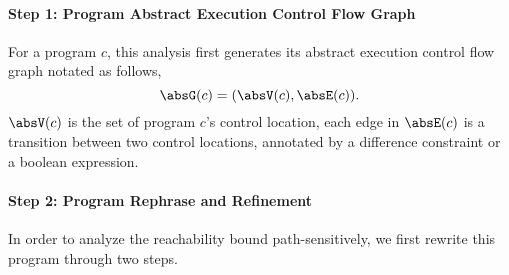\paragraph{Step 1: Program Abstract Execution Control Flow Graph}
For a program $c$, this analysis first generates its abstract execution control flow graph notated as follows,
\[\absG(c) =(\absV(c), \absE(c)).\]
%
$\absV(c)$ is the set of program $c$'s control location, each edge in $\absE(c)$ is a transition
between two control locations, annotated by a difference constraint \cite{sinn2017complexity} or a boolean expression.
\paragraph{Step 2: Program Rephrase and Refinement}
In order to analyze the reachability bound path-sensitively, we first rewrite this program through two steps.
